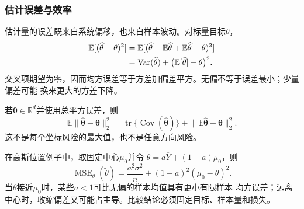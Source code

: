 \subsubsection{估计误差与效率}
\label{sec:statistics-bias-efficiency}
估计量的误差既来自系统偏移，也来自样本波动。对标量目标\(\theta\)，
\begin{align}
  \mathbb{E}[(\widehat\theta-\theta)^2]
  &=
  \mathbb{E}[(\widehat\theta-\mathbb{E}\widehat\theta
  +\mathbb{E}\widehat\theta-\theta)^2] \notag\\
  &=
  \operatorname{Var}(\widehat\theta)
  +\bigl(\mathbb{E}[\widehat\theta]-\theta\bigr)^2.
  \label{eq:statistics-mse-decomposition}
\end{align}
交叉项期望为零，因而均方误差等于方差加偏差平方。无偏不等于误差最小；少量偏差可能
换来更大的方差下降。

若\(\bm\theta\in\mathbb{R}^d\)并使用总平方误差，则
\[
  \mathbb{E}\lVert\widehat{\bm\theta}-\bm\theta\rVert_2^2
  =\operatorname{tr}\{\operatorname{Cov}(\widehat{\bm\theta})\}
   +\lVert\mathbb{E}\widehat{\bm\theta}-\bm\theta\rVert_2^2.
\]
这不是每个坐标风险的最大值，也不是任意方向风险。

在高斯位置例子中，取固定中心\(\mu_0\)并令
\(\widetilde\theta=a\overline Y+(1-a)\mu_0\)，则
\[
  \operatorname{MSE}_\theta(\widetilde\theta)
  =\frac{a^2\sigma^2}{n}+(1-a)^2(\mu_0-\theta)^2.
\]
当\(\theta\)接近\(\mu_0\)时，某些\(a<1\)可比无偏的样本均值具有更小有限样本
均方误差；远离中心时，收缩偏差又可能占主导。比较结论必须固定目标、样本量和损失。

